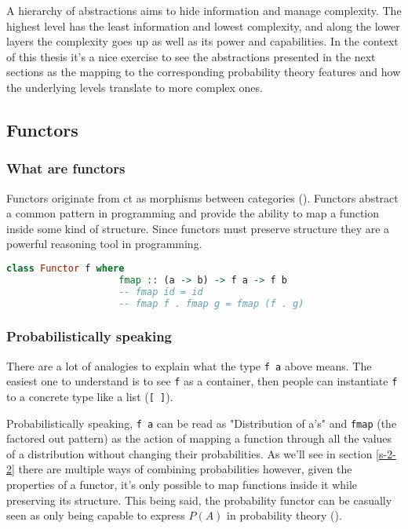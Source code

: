 \documentclass[
  oneside,
  11pt, a4paper,
  footinclude=true,
  headinclude=true,
  cleardoublepage=empty
]{scrbook}
\theoremstyle{definition}
\theoremstyle{definition}
\begin{document}
	    A hierarchy of abstractions aims to hide information and manage complexity. The highest level has the least information and lowest complexity, and along the lower layers the complexity goes up as well as its power and capabilities. In the context of this thesis it's a nice exercise to see the abstractions presented in the next sections as the mapping to the corresponding probability theory features and how the underlying levels translate to more complex ones.
	    
	    \subsection{Functors}
	    
	        \subsubsection{What are functors}
	        
	            Functors originate from \gls{ct} as morphisms between categories (\cite{Awodey:2010:CT:2060081}). Functors abstract a common pattern in programming and provide the ability to map a function inside some kind of structure. Since functors must preserve structure they are a powerful reasoning tool in programming.
	            
	            \begin{lstlisting}[mathescape, language=Haskell, caption={Functor laws},captionpos=b]
                class Functor f where
                    fmap :: (a -> b) -> f a -> f b
                    -- fmap id = id
                    -- fmap f . fmap g = fmap (f . g)
	            \end{lstlisting}{}
	            
	        \subsubsection{Probabilistically speaking}
	        
	           There are a lot of analogies to explain what the type \texttt{f a} above means. The easiest one to understand is to see \texttt{f} as a container, then people can instantiate \texttt{f} to a concrete type like a list (\texttt{[ ]}).
	           
	           Probabilistically speaking, \texttt{f a} can be read as "Distribution of a's" and \texttt{fmap} (the factored out pattern) as the action of mapping a function through all the values of a distribution without changing their probabilities. As we'll see in section \ref{s-2-2} there are multiple ways of combining probabilities however, given the properties of a functor, it's only possible to map functions inside it while preserving its structure. This being said, the probability functor can be casually seen as only being capable to express $P(A)$ in probability theory (\cite{jtobin}).
	
\end{document}
